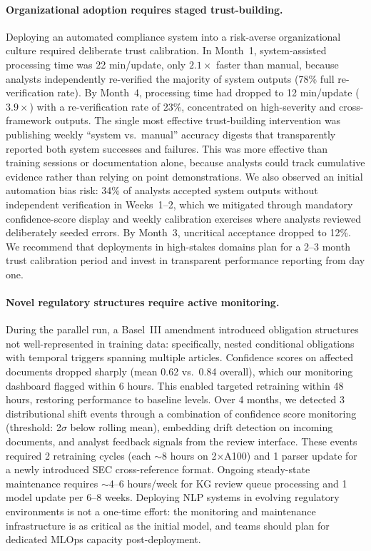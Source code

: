 \documentclass[11pt]{article}
\begin{document}
\paragraph{Organizational adoption requires staged trust-building.} Deploying an automated compliance system into a risk-averse organizational culture required deliberate trust calibration. In Month~1, system-assisted processing time was 22 min/update, only $2.1\times$ faster than manual, because analysts independently re-verified the majority of system outputs (78\% full re-verification rate). By Month~4, processing time had dropped to 12 min/update ($3.9\times$) with a re-verification rate of 23\%, concentrated on high-severity and cross-framework outputs. The single most effective trust-building intervention was publishing weekly ``system vs.\ manual'' accuracy digests that transparently reported both system successes and failures. This was more effective than training sessions or documentation alone, because analysts could track cumulative evidence rather than relying on point demonstrations. We also observed an initial automation bias risk: 34\% of analysts accepted system outputs without independent verification in Weeks~1--2, which we mitigated through mandatory confidence-score display and weekly calibration exercises where analysts reviewed deliberately seeded errors. By Month~3, uncritical acceptance dropped to 12\%. We recommend that deployments in high-stakes domains plan for a 2--3 month trust calibration period and invest in transparent performance reporting from day one.

\paragraph{Novel regulatory structures require active monitoring.} During the parallel run, a Basel~III amendment introduced obligation structures not well-represented in training data: specifically, nested conditional obligations with temporal triggers spanning multiple articles. Confidence scores on affected documents dropped sharply (mean 0.62 vs.\ 0.84 overall), which our monitoring dashboard flagged within 6 hours. This enabled targeted retraining within 48 hours, restoring performance to baseline levels. Over 4 months, we detected 3 distributional shift events through a combination of confidence score monitoring (threshold: 2$\sigma$ below rolling mean), embedding drift detection on incoming documents, and analyst feedback signals from the review interface. These events required 2 retraining cycles (each $\sim$8 hours on 2$\times$A100) and 1 parser update for a newly introduced SEC cross-reference format. Ongoing steady-state maintenance requires $\sim$4--6 hours/week for KG review queue processing and 1 model update per 6--8 weeks. Deploying NLP systems in evolving regulatory environments is not a one-time effort: the monitoring and maintenance infrastructure is as critical as the initial model, and teams should plan for dedicated MLOps capacity post-deployment.
\end{document}
